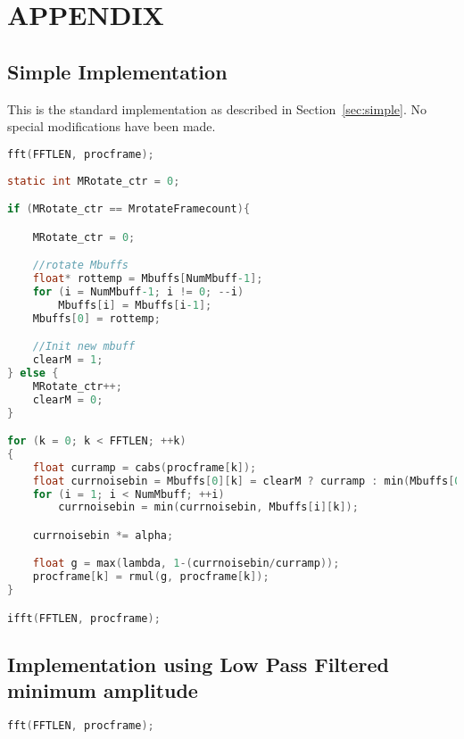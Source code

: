 \documentclass[11pt]{article} %
\begin{document}
{\clearpage

\section{APPENDIX}
\renewcommand{\thesubsection}{\Alph{subsection}}
\subsection{Simple Implementation} 
\label{app:simple}

This is the standard implementation as described in Section~\ref{sec:simple}. No special modifications have been made. 
  \begin{center}
    \begin{lstlisting}[language = C]
fft(FFTLEN, procframe);
									
static int MRotate_ctr = 0;

if (MRotate_ctr == MrotateFramecount){

	MRotate_ctr = 0;

	//rotate Mbuffs
	float* rottemp = Mbuffs[NumMbuff-1];
	for (i = NumMbuff-1; i != 0; --i)
		Mbuffs[i] = Mbuffs[i-1];
	Mbuffs[0] = rottemp;

	//Init new mbuff
	clearM = 1;
} else {
	MRotate_ctr++;
	clearM = 0;
}

for (k = 0; k < FFTLEN; ++k)
{
	float curramp = cabs(procframe[k]); 
	float currnoisebin = Mbuffs[0][k] = clearM ? curramp : min(Mbuffs[0][k], curramp);
	for (i = 1; i < NumMbuff; ++i)
		currnoisebin = min(currnoisebin, Mbuffs[i][k]);

	currnoisebin *= alpha;

	float g = max(lambda, 1-(currnoisebin/curramp));
	procframe[k] = rmul(g, procframe[k]);
}

ifft(FFTLEN, procframe);

    \end{lstlisting}
  \end{center}

\clearpage

 \subsection{Implementation using Low Pass Filtered minimum amplitude} %
 \label{sub:implementation_using_low_pass_filtered_minimum_amplitude}
 \begin{center}
 	\begin{lstlisting}[language = C]
fft(FFTLEN, procframe);
									

\end{lstlisting}
\end{center}}
\end{document}
